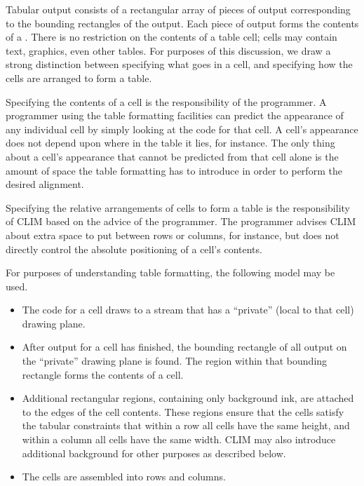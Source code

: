 Tabular output consists of a rectangular array of pieces of output corresponding
to the bounding rectangles of the output.  Each piece of output forms the
contents of a .  There is no restriction on the contents of
a table cell; cells may contain text, graphics, even other tables.  For purposes
of this discussion, we draw a strong distinction between specifying what goes in
a cell, and specifying how the cells are arranged to form a table.

Specifying the contents of a cell is the responsibility of the programmer.  A
programmer using the table formatting facilities can predict the appearance of
any individual cell by simply looking at the code for that cell.  A cell's
appearance does not depend upon where in the table it lies, for instance.  The
only thing about a cell's appearance that cannot be predicted from that cell
alone is the amount of space the table formatting has to introduce in order to
perform the desired alignment.

Specifying the relative arrangements of cells to form a table is the
responsibility of CLIM based on the advice of the programmer.  The programmer
advises CLIM about extra space to put between rows or columns, for instance, but
does not directly control the absolute positioning of a cell's contents.

For purposes of understanding table formatting, the following model may
be used. 
\begin{itemize}
\item The code for a cell draws to a stream that has a ``private''  (local to
that cell) drawing plane.

\item After output for a cell has finished, the bounding rectangle of all output
on the ``private'' drawing plane is found.  The region within that bounding
rectangle forms the contents of a cell.

\item Additional rectangular regions, containing only background ink, are
attached to the edges of the cell contents.  These regions ensure that the
cells satisfy the tabular constraints that within a row all cells have the same
height, and within a column all cells have the same width.  CLIM may also
introduce additional background for other purposes as described below.

\item The cells are assembled into rows and columns.
\end{itemize}

